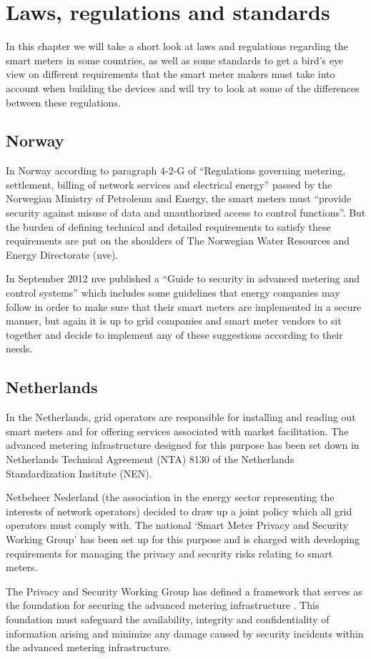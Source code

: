 \chapter{Laws, regulations and standards}
In this chapter we will take a short look at laws and regulations regarding the smart meters in some countries, as well as some standards to get a bird's eye view on different requirements that the smart meter makers must take into account when building the devices and will try to look at some of the differences between these regulations.

\section{Norway}
In Norway according to paragraph 4-2-G of “Regulations governing metering, settlement, billing of network services and electrical energy”  \citep{lovdata} passed by the Norwegian Ministry of Petroleum and Energy, the smart meters must “provide security against misuse of data and unauthorized access to control functions”. But the burden of defining technical and detailed requirements to satisfy these requirements are put on the shoulders of The Norwegian Water Resources and Energy Directorate (\ac{nve}).\par
In September 2012 \ac{nve} published a “Guide to security in advanced metering and control systems” \citep{nve} which includes some guidelines that energy companies may follow in order to make sure that their smart meters are implemented in a secure manner, but again it is up to grid companies and smart meter vendors to sit together and decide to implement any of these suggestions according to their needs.

\section{Netherlands}
In the Netherlands, grid operators are responsible for installing and reading out smart meters and for offering services associated with market facilitation. The advanced metering infrastructure designed for this purpose has been set down in Netherlands Technical Agreement (NTA) 8130 \citep{dutch2} of the Netherlands Standardization Institute (NEN).\par
Netbeheer Nederland (the association in the energy sector representing the interests of network operators) decided to draw up a joint policy which all grid operators must comply with. The national ‘Smart Meter Privacy and Security Working Group’ has been set up for this purpose and is charged with developing requirements for managing the privacy and security risks relating to smart meters.\par
The Privacy and Security Working Group has defined a framework that serves as the foundation for securing the advanced metering infrastructure \citep{dutch1}. This foundation must safeguard the availability, integrity and confidentiality of information arising and minimize any damage caused by security incidents within the advanced metering infrastructure.


